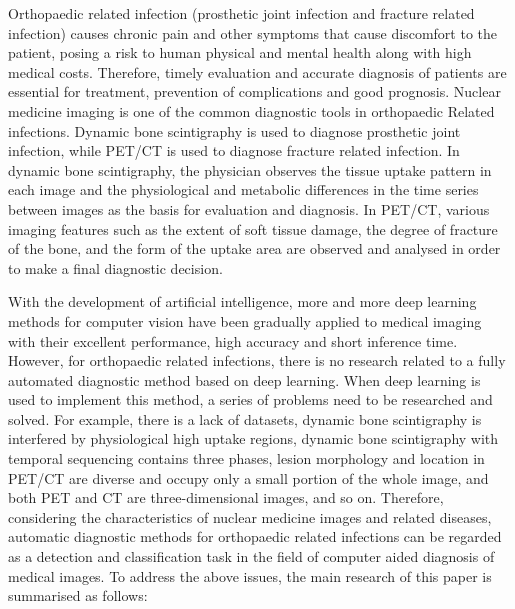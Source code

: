 \begin{eabstract}
    Orthopaedic related infection (prosthetic joint infection and fracture related infection) causes chronic pain and other symptoms that cause discomfort to the patient, posing a risk to human physical and mental health along with high medical costs. Therefore, timely evaluation and accurate diagnosis of patients are essential for treatment, prevention of complications and good prognosis. Nuclear medicine imaging is one of the common diagnostic tools in orthopaedic Related infections. Dynamic bone scintigraphy is used to diagnose prosthetic joint infection, while PET/CT is used to diagnose fracture related infection. In dynamic bone scintigraphy, the physician observes the tissue uptake pattern in each image and the physiological and metabolic differences in the time series between images as the basis for evaluation and diagnosis. In PET/CT, various imaging features such as the extent of soft tissue damage, the degree of fracture of the bone, and the form of the uptake area are observed and analysed in order to make a final diagnostic decision.

    With the development of artificial intelligence, more and more deep learning methods for computer vision have been gradually applied to medical imaging with their excellent performance, high accuracy and short inference time. However, for orthopaedic related infections, there is no research related to a fully automated diagnostic method based on deep learning. When deep learning is used to implement this method, a series of problems need to be researched and solved. For example, there is a lack of datasets, dynamic bone scintigraphy is interfered by physiological high uptake regions, dynamic bone scintigraphy with temporal sequencing contains three phases, lesion morphology and location in PET/CT are diverse and occupy only a small portion of the whole image, and both PET and CT are three-dimensional images, and so on. Therefore, considering the characteristics of nuclear medicine images and related diseases, automatic diagnostic methods for orthopaedic related infections can be regarded as a detection and classification task in the field of computer aided diagnosis of medical images. To address the above issues, the main research of this paper is summarised as follows:


\end{eabstract}

